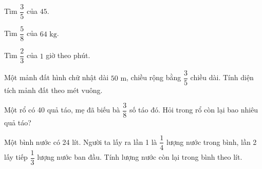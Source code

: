 \begin{ex} %
Tìm $\dfrac{3}{5}$ của $45$.
\end{ex}

\begin{ex} %
Tìm $\dfrac{5}{8}$ của $64\text{ kg}$.
\end{ex}

\begin{ex} %
Tìm $\dfrac{2}{3}$ của $1$ giờ theo phút.
\end{ex}

\begin{ex} %
Một mảnh đất hình chữ nhật dài $50\text{ m}$, chiều rộng bằng $\dfrac{3}{5}$ chiều dài. Tính diện tích mảnh đất theo mét vuông.
\end{ex}

\begin{ex} %
Một rổ có 40 quả táo, mẹ đã biếu bà $\dfrac{3}{8}$ số táo đó. Hỏi trong rổ còn lại bao nhiêu quả táo?
\end{ex}

\begin{ex} %
Một bình nước có 24 lít. Người ta lấy ra lần 1 là $\dfrac{1}{4}$ lượng nước trong bình, lần 2 lấy tiếp $\dfrac{1}{3}$ lượng nước ban đầu. Tính lượng nước còn lại trong bình theo lít.
\end{ex}
